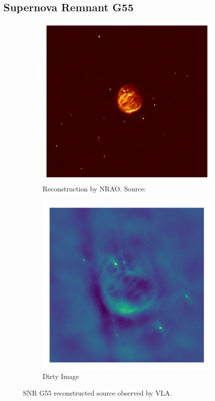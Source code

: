 \subsection{Supernova Remnant G55}
\begin{figure}[h]
	\centering
	\begin{subfigure}[b]{0.45\linewidth}
		\includegraphics[width=\linewidth, trim={230px 210px 225px 200px}, clip]{./chapters/05.results/pic_G55_7.png}
		\caption{Reconstruction by NRAO.  Source:\cite{nraoG55}}
	\end{subfigure}
	\begin{subfigure}[b]{0.45\linewidth}
		\includegraphics[width=\linewidth, trim={18px 19px 18px 18px}, clip]{./chapters/05.results/g55/raw_image.png}
		\caption{Dirty Image}
	\end{subfigure}
	\caption{SNR G55 reconstructed source observed by VLA.}
	\label{results:g55:nrao}
\end{figure}


